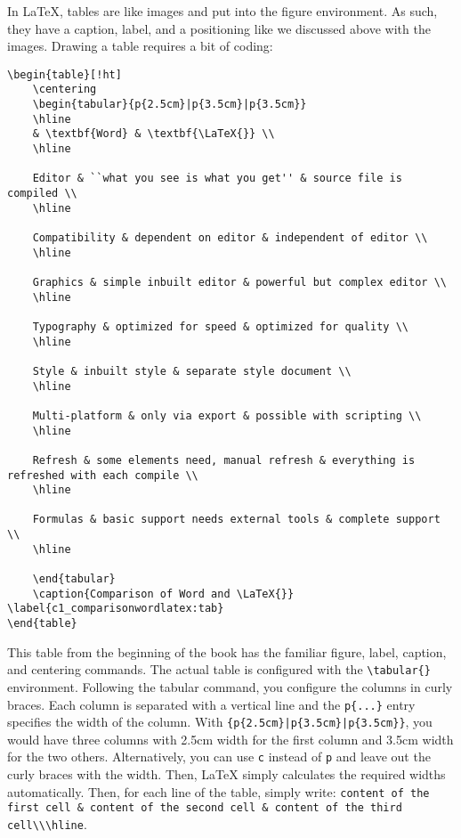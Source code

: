 In \LaTeX{}, tables are like images and put into the figure environment. As
such, they have a caption, label, and a positioning like we discussed above with
the images. Drawing a table requires a bit of coding:
\begin{lstlisting}[language=Tex]
\begin{table}[!ht]
    \centering
    \begin{tabular}{p{2.5cm}|p{3.5cm}|p{3.5cm}}
    \hline
    & \textbf{Word} & \textbf{\LaTeX{}} \\ 
    \hline
    
    Editor & ``what you see is what you get'' & source file is compiled \\
    \hline
    
    Compatibility & dependent on editor & independent of editor \\
    \hline
    
    Graphics & simple inbuilt editor & powerful but complex editor \\
    \hline
    
    Typography & optimized for speed & optimized for quality \\
    \hline
    
    Style & inbuilt style & separate style document \\
    \hline
    
    Multi-platform & only via export & possible with scripting \\
    \hline
    
    Refresh & some elements need, manual refresh & everything is refreshed with each compile \\
    \hline
    
    Formulas & basic support needs external tools & complete support \\
    \hline
    
    \end{tabular}
    \caption{Comparison of Word and \LaTeX{}} \label{c1_comparisonwordlatex:tab}
\end{table}
\end{lstlisting}

This table from the beginning of the book has the familiar figure, label,
caption, and centering commands. The actual table is configured with the
\lstinline[language=Tex]!\tabular{}! environment. Following the tabular command,
you configure the columns in curly braces. Each column is separated with a
vertical line and the \lstinline[language=Tex]!p{...}! entry specifies the width
of the column. With \lstinline[language=Tex]!{p{2.5cm}|p{3.5cm}|p{3.5cm}}!, you
would have three columns with 2.5cm width for the first column and 3.5cm width
for the two others. Alternatively, you can use \lstinline[language=Tex]!c!
instead of \lstinline[language=Tex]!p! and leave out the curly braces with the
width. Then, \LaTeX{} simply calculates the required widths automatically. Then,
for each line of the table, simply write: 
\lstinline[language=Tex]!content of the first cell & content of the second cell & content of the third cell\\\hline!.

